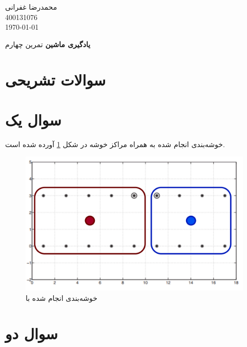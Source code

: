 \documentclass[12pt, a4paper]{article}
\newcommand{\coursetitle}{یادگیری ماشین}
\newcommand{\doctitle}{تمرین چهارم}
\newcommand{\name}{محمدرضا غفرانی}
\newcommand{\studentno}{400131076}
\newcommand{\todaydate}{\today}
\begin{document}
\begin{flushleft}
    \name \\
    \studentno \\
    \todaydate
\end{flushleft}

\begin{center}
    \huge
    \textbf{\coursetitle}
    \break
    \large
    \doctitle
\end{center}

\thispagestyle{plain}

\section*{سوالات تشریحی}
\section*{سوال یک}

خوشه‌بندی انجام شده به همراه مراکز خوشه در شکل \ref{kmeans} آورده شده است.

\begin{figure}[h]
    \centering
    \includegraphics[width=0.8\linewidth]{images/long_answer/q1/kmeans.png}
    \caption{خوشه‌بندی انجام شده با }
    \label{kmeans}
\end{figure}

\section*{سوال دو}
\end{document}
